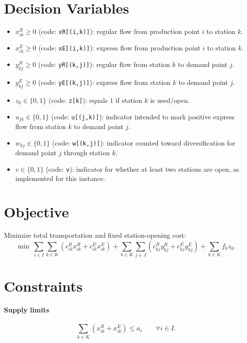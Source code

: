 \section*{Decision Variables}

\begin{itemize}
\item $x^{R}_{ik} \ge 0$ (code: \texttt{xR[(i,k)]}): regular flow from production point $i$ to station $k$.
\item $x^{E}_{ik} \ge 0$ (code: \texttt{xE[(i,k)]}): express flow from production point $i$ to station $k$.
\item $y^{R}_{kj} \ge 0$ (code: \texttt{yR[(k,j)]}): regular flow from station $k$ to demand point $j$.
\item $y^{E}_{kj} \ge 0$ (code: \texttt{yE[(k,j)]}): express flow from station $k$ to demand point $j$.
\item $z_k \in \{0,1\}$ (code: \texttt{z[k]}): equals $1$ if station $k$ is used/open.
\item $u_{jk} \in \{0,1\}$ (code: \texttt{u[(j,k)]}): indicator intended to mark positive express flow from station $k$ to demand point $j$.
\item $w_{kj} \in \{0,1\}$ (code: \texttt{w[(k,j)]}): indicator counted toward diversification for demand point $j$ through station $k$.
\item $v \in \{0,1\}$ (code: \texttt{v}): indicator for whether at least two stations are open, as implemented for this instance.
\end{itemize}

\section*{Objective}

Minimize total transportation and fixed station-opening cost:
\[
\min \;
\sum_{i\in I}\sum_{k\in K}
\left(c^{R}_{ik}x^{R}_{ik}+c^{E}_{ik}x^{E}_{ik}\right)
+
\sum_{k\in K}\sum_{j\in J}
\left(c^{R}_{kj}y^{R}_{kj}+c^{E}_{kj}y^{E}_{kj}\right)
+
\sum_{k\in K} f_k z_k .
\]

\section*{Constraints}

\paragraph{Supply limits}
\[
\sum_{k\in K}\left(x^{R}_{ik}+x^{E}_{ik}\right)\le a_i
\qquad \forall i\in I .
\]

